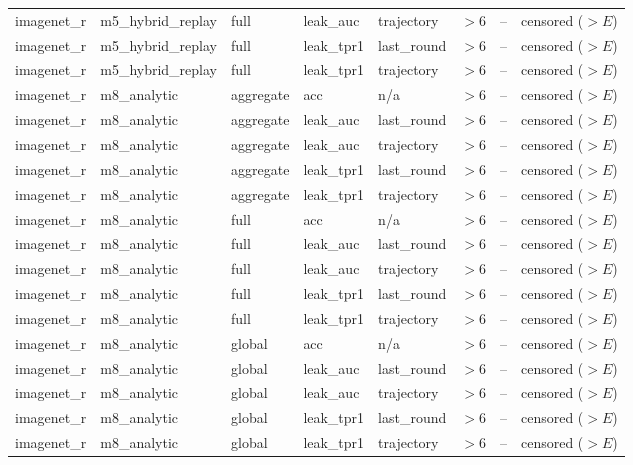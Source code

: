 \begin{tabular}{lllllrrl}
imagenet\_r & m5\_hybrid\_replay & full & leak\_auc & trajectory & $>$6 & -- & censored ($>E$) \\
imagenet\_r & m5\_hybrid\_replay & full & leak\_tpr1 & last\_round & $>$6 & -- & censored ($>E$) \\
imagenet\_r & m5\_hybrid\_replay & full & leak\_tpr1 & trajectory & $>$6 & -- & censored ($>E$) \\
imagenet\_r & m8\_analytic & aggregate & acc & n/a & $>$6 & -- & censored ($>E$) \\
imagenet\_r & m8\_analytic & aggregate & leak\_auc & last\_round & $>$6 & -- & censored ($>E$) \\
imagenet\_r & m8\_analytic & aggregate & leak\_auc & trajectory & $>$6 & -- & censored ($>E$) \\
imagenet\_r & m8\_analytic & aggregate & leak\_tpr1 & last\_round & $>$6 & -- & censored ($>E$) \\
imagenet\_r & m8\_analytic & aggregate & leak\_tpr1 & trajectory & $>$6 & -- & censored ($>E$) \\
imagenet\_r & m8\_analytic & full & acc & n/a & $>$6 & -- & censored ($>E$) \\
imagenet\_r & m8\_analytic & full & leak\_auc & last\_round & $>$6 & -- & censored ($>E$) \\
imagenet\_r & m8\_analytic & full & leak\_auc & trajectory & $>$6 & -- & censored ($>E$) \\
imagenet\_r & m8\_analytic & full & leak\_tpr1 & last\_round & $>$6 & -- & censored ($>E$) \\
imagenet\_r & m8\_analytic & full & leak\_tpr1 & trajectory & $>$6 & -- & censored ($>E$) \\
imagenet\_r & m8\_analytic & global & acc & n/a & $>$6 & -- & censored ($>E$) \\
imagenet\_r & m8\_analytic & global & leak\_auc & last\_round & $>$6 & -- & censored ($>E$) \\
imagenet\_r & m8\_analytic & global & leak\_auc & trajectory & $>$6 & -- & censored ($>E$) \\
imagenet\_r & m8\_analytic & global & leak\_tpr1 & last\_round & $>$6 & -- & censored ($>E$) \\
imagenet\_r & m8\_analytic & global & leak\_tpr1 & trajectory & $>$6 & -- & censored ($>E$) \\
\bottomrule
\end{tabular}
